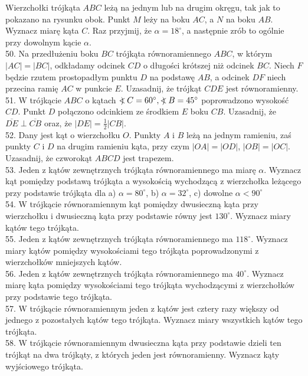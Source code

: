 \documentclass[10pt]{article}
\newcommand\Varangle{\mathop{{<\!\!\!\!\!\text{\small)}}\:}\nolimits}
\begin{document}
Wierzchołki trójkąta \(A B C\) leżą na jednym lub na drugim okręgu, tak jak to pokazano na rysunku obok. Punkt \(M\) leży na boku \(A C\), a \(N\) na boku \(A B\). Wyznacz miarę kąta \(C\). Raz przyjmij, że \(\alpha=18^{\circ}\), a następnie zrób to ogólnie przy dowolnym kącie \(\alpha\).\\
50. Na przedłużeniu boku \(B C\) trójkąta równoramiennego \(A B C\), w którym \(|A C|=|B C|\), odkładamy odcinek \(C D\) o długości krótszej niż odcinek \(B C\). Niech \(F\) będzie rzutem prostopadłym punktu \(D\) na podstawę \(A B\), a odcinek \(D F\) niech przecina ramię \(A C\) w punkcie \(E\). Uzasadnij, że trójkąt \(C D E\) jest równoramienny.\\
51. W trójkącie \(A B C\) o kątach \(\Varangle C=60^{\circ}, \Varangle B=45^{\circ}\) poprowadzono wysokość \(C D\). Punkt \(D\) połączono odcinkiem ze środkiem \(E\) boku \(C B\). Uzasadnij, że \(\overline{D E} \perp \overline{C B}\) oraz, że \(|D E|=\frac{1}{2}|C B|\).\\
52. Dany jest kąt o wierzchołku \(O\). Punkty \(A\) i \(B\) leżą na jednym ramieniu, zaś punkty \(C\) i \(D\) na drugim ramieniu kąta, przy czym \(|O A|=|O D|\), \(|O B|=|O C|\). Uzasadnij, że czworokąt \(A B C D\) jest trapezem.\\
53. Jeden z kątów zewnętrznych trójkąta równoramiennego ma miarę \(\alpha\). Wyznacz kąt pomiędzy podstawą trójkąta a wysokością wychodzącą z wierzchołka leżącego przy podstawie trójkąta dla a) \(\alpha=80^{\circ}\), b) \(\alpha=32^{\circ}\), c) dowolne \(\alpha<90^{\circ}\)\\
54. W trójkącie równoramiennym kąt pomiędzy dwusieczną kąta przy wierzchołku i dwusieczną kąta przy podstawie równy jest \(130^{\circ}\). Wyznacz miary kątów tego trójkąta.\\
55. Jeden z kątów zewnętrznych trójkąta równoramiennego ma \(118^{\circ}\). Wyznacz miary kątów pomiędzy wysokościami tego trójkąta poprowadzonymi z wierzchołków mniejszych kątów.\\
56. Jeden z kątów zewnętrznych trójkąta równoramiennego ma \(40^{\circ}\). Wyznacz miarę kąta pomiędzy wysokościami tego trójkąta wychodzącymi z wierzchołków przy podstawie tego trójkąta.\\
57. W trójkącie równoramiennym jeden z kątów jest cztery razy większy od jednego z pozostałych kątów tego trójkąta. Wyznacz miary wszystkich kątów tego trójkąta.\\
58. W trójkącie równoramiennym dwusieczna kąta przy podstawie dzieli ten trójkąt na dwa trójkąty, z których jeden jest równoramienny. Wyznacz kąty wyjściowego trójkąta.\\
\end{document}
